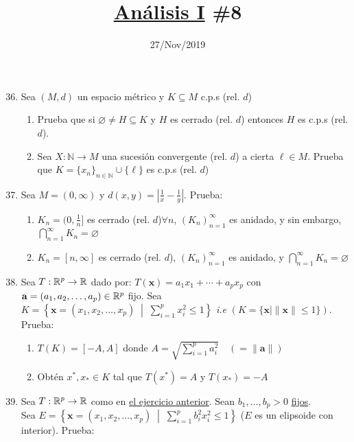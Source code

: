 \documentclass{article}
\title{
\underline{Análisis I} \hfill \#8}
\date{27/Nov/2019}
\newcommand{\N}{\mathbb{N}}
\begin{document}
\maketitle

\begin{enumerate}
    \setcounter{enumi}{35}
    \item Sea $(M,d)$ un espacio métrico y $K\subseteq M$ c.p.s (rel. $d$)
    \begin{enumerate}
        \item Prueba que si $\varnothing \neq H \subseteq K$ y $H$ es cerrado (rel. $d$) entonces $H$ es c.p.s (rel. $d$).
        \item Sea $X:\N \to M$ una sucesión convergente (rel. $d$) a cierta $\ell \in M$. Prueba que $K = \displaystyle \{x_{n} \}_{n\in\N} \cup \{\ell\}$ es c.p.s (rel. $d$)
    \end{enumerate}
    \item Sea $M=(0, \infty)$ y $d(x,y)= \displaystyle \left\lvert \frac{1}{x} - \frac{1}{y} \right\rvert$. Prueba: 
    \begin{enumerate}
        \item $\displaystyle K_{n} = (0,\frac{1}{n}]$ es cerrado (rel. $d$)$\forall n$, $\displaystyle(K_{n})_{n=1}^{\infty}$ es anidado, y sin embargo, $\displaystyle \bigcap_{n=1}^{\infty} K_{n} = \varnothing$
        \item $\displaystyle K_{n} = [n, \infty]$ es cerrado (rel. $d$), $\displaystyle(K_{n})_{n=1}^{\infty}$ es anidado, y $\displaystyle\bigcap_{n=1}^{\infty} K_{n} = \varnothing$
    \end{enumerate}
    \item Sea $T:\mathbb{R}^{p} \to\mathbb{R}$ dado por: $T(\mathbf{x})=a_{1} x_{1} + \cdots + a_{p} x_{p}$ con $\mathbf{a}=(a_{1}, a_{2}, \ldots, a_{p})\in \mathbb{R}^{p}$ fijo. Sea $K=\left\{  \mathbf{x}=(x_{1}, x_{2}, \ldots, x_{p}) \; \middle | \; \displaystyle \sum_{i=1}^{p}x_{i}^{2} \leq 1 \right\}$ \textit{i.e} $(K=\{\mathbf{x} \mid \|\mathbf{x}\| \leq 1\})$. Prueba: 
    \begin{enumerate}
        \item $T(K) = [-A, A]$ donde $\displaystyle A = \sqrt{\sum_{i=1}^{p} a_{i}^{2}} \quad (=\|\mathbf{a}\|)$
        \item Obtén $x^{*}, x_{*} \in K$ tal que $T(x^{*})=A$ y $T(x_{*})=-A$
    \end{enumerate}
    \item Sea $T:\mathbb{R}^{p} \to \mathbb{R}$ como en \underline{el ejercicio anterior}. Sean $b_{1}, \ldots, b_{p} > 0$ \underline{fijos}.\\ Sea $\displaystyle E=\left\{ \mathbf{x} = (x_{1}, x_{2}, \dots, x_{p}) \; \middle | \; \sum_{i=1}^{p} b_{i}^{2} x_{i}^{2} \leq 1 \right\}$ ($E$ es un elipsoide con interior). Prueba: 

\end{enumerate}
\end{document}
